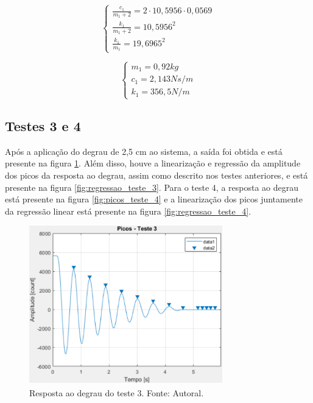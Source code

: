 \documentclass{ifacconf}
\begin{document}
\begin{equation}
  \left\{
\begin{array}{lr}
  \frac{c_1}{m_1 + 2} = 2 \cdot 10,5956 \cdot 0,0569 \\
  \frac{k_1}{m_1 + 2} = 10,5956^2 \\
  \frac{k_1}{m_1} = 19,6965^2
\end{array}
\right.
\end{equation}

\begin{equation}
  \left\{
\begin{array}{lr}
  m_1 = 0,92 kg \\
  c_1 = 2,143 Ns/m \\
  k_1 = 356,5  N/m
\end{array}
\right.
\end{equation}
\subsection{Testes 3 e 4}

Após a aplicação do degrau de 2,5 cm ao sistema, a saída foi obtida e está presente na figura \ref{fig:picos_teste_3}.
Além disso, houve a linearização e regressão da amplitude dos picos da resposta ao degrau, assim como descrito nos testes anteriores,
e está presente na figura \ref{fig:regressao_teste_3}. Para o teste 4, a resposta ao degrau está presente na figura \ref{fig:picos_teste_4}
e a linearização dos picos juntamente da regressão linear está presente na figura \ref{fig:regressao_teste_4}.
\begin{figure}[!htb]
  \begin{center}
  \includegraphics[width=8.4cm]{figures/picos_teste_3.png}    %
  \caption{Resposta ao degrau do teste 3. Fonte: Autoral.} 
  \label{fig:picos_teste_3}
  \end{center}
\end{figure}
\end{document}
